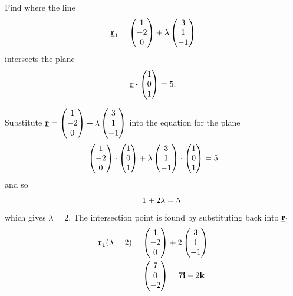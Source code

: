 \begin{example}[Video]
Find where the line
\[
\underline{\mathbf{r}}_1
=\begin{pmatrix}1\\-2\\0\end{pmatrix}
+\lambda\begin{pmatrix}3\\1\\-1\end{pmatrix}
\]
intersects the plane
\[
\underline{\mathbf{r}}\boldsymbol{\cdot}
\begin{pmatrix}1\\0\\1\end{pmatrix}=5.
\]
\end{example}

\begin{solution}
Substitute $\underline{\mathbf{r}}=\begin{pmatrix}1\\-2\\0\end{pmatrix}+\lambda\begin{pmatrix}3\\1\\-1\end{pmatrix}$ into the equation for the plane
\[
\begin{pmatrix}1\\-2\\0\end{pmatrix}\cdot\begin{pmatrix}1\\0\\1\end{pmatrix}
+\lambda\begin{pmatrix}3\\1\\-1\end{pmatrix}\cdot\begin{pmatrix}1\\0\\1\end{pmatrix}=5
\]
and so
\[
\qquad 1+2\lambda=5
\]
which gives $\lambda=2$. The intersection point is found by substituting back into $\underline{\mathbf{r}}_1$
\begin{align*}
    \underline{\mathbf{r}}_1(\lambda = 2) &= 
\begin{pmatrix}1\\-2\\0\end{pmatrix}+2\begin{pmatrix}3\\1\\-1\end{pmatrix}\\
&=\begin{pmatrix}7\\0\\-2\end{pmatrix}=7\underline{\mathbf{i}}-2\underline{\mathbf{k}}
\end{align*}
\end{solution}


